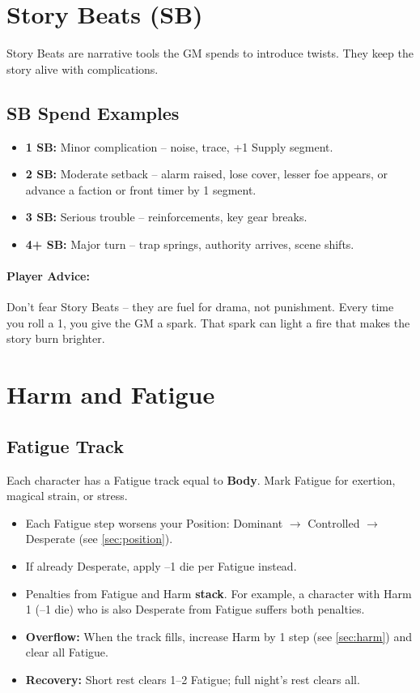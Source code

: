 \section{Story Beats (SB)}
\label{sec:story-beats}

Story Beats are narrative tools the GM spends to introduce twists. They keep the story alive with complications.

\subsection{SB Spend Examples}
\label{sec:sb-spend}

\begin{itemize}
  \item \textbf{1 SB:} Minor complication -- noise, trace, +1 Supply segment.
  \item \textbf{2 SB:} Moderate setback -- alarm raised, lose cover, lesser foe appears, or advance a faction or front timer by 1 segment.
  \item \textbf{3 SB:} Serious trouble -- reinforcements, key gear breaks.
  \item \textbf{4+ SB:} Major turn -- trap springs, authority arrives, scene shifts.
\end{itemize}

\paragraph{Player Advice:} Don't fear Story Beats -- they are fuel for drama, not punishment. Every time you roll a 1, you give the GM a spark. That spark can light a fire that makes the story burn brighter.

\section{Harm and Fatigue}
\label{sec:harm-fatigue}

\subsection{Fatigue Track}
\label{sec:fatigue}
Each character has a Fatigue track equal to \textbf{Body}. Mark Fatigue for exertion, magical strain, or stress.

\begin{itemize}
  \item Each Fatigue step worsens your Position: Dominant $\rightarrow$ Controlled $\rightarrow$ Desperate (see \ref{sec:position}).
  \item If already Desperate, apply --1 die per Fatigue instead.
  \item Penalties from Fatigue and Harm \textbf{stack}. For example, a character with Harm 1 (--1 die) who is also Desperate from Fatigue suffers both penalties.
  \item \textbf{Overflow:} When the track fills, increase Harm by 1 step (see \ref{sec:harm}) and clear all Fatigue.
  \item \textbf{Recovery:} Short rest clears 1--2 Fatigue; full night's rest clears all.
\end{itemize}

